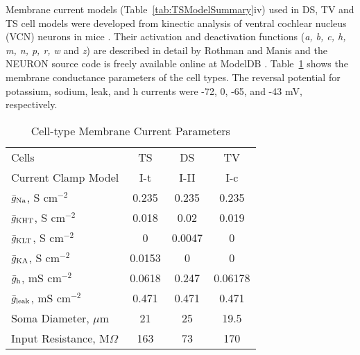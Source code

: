 Membrane current models (Table~\ref{tab:TSModelSummary}iv) used in
DS, TV and TS cell models were developed from kinectic analysis of
ventral cochlear nucleus (VCN) neurons in mice
\cite{RothmanManis:2003b}. Their activation and deactivation
functions (\textit{a, b, c, h, m, n, p, r, w} and \textit{z}) are
described in detail by Rothman and Manis \cite{RothmanManis:2003}
and the NEURON source code is freely available online at ModelDB
\cite{HinesMorseEtAl:2004}.  Table~\ref{tab:2} shows the membrane
conductance parameters of the cell types.  
The reversal potential for potassium, sodium, leak, and h currents were -72,
0, -65, and -43 mV, respectively.

\begin{table}[!th]
  \centering
  \caption{Cell-type Membrane Current Parameters}\label{tab:2}
  \begin{tabular}{lccc}
\hline
                Cells                 &   TS   &   DS   &   TV     \\ %
         Current Clamp Model          &  I-t   &  I-II  &   I-c    \\
\hline
 $\bar{g}_{{\rm Na}} $, S cm$^{-2}$   & 0.235  & 0.235  &  0.235      \\ %
 $\bar{g}_{{\rm KHT}} $, S cm$^{-2}$  & 0.018  &  0.02  &  0.019      \\ %
$\bar{g}_{{\rm  KLT}} $, S cm$^{-2}$  &   0    & 0.0047 &    0         \\ %
 $\bar{g}_{{\rm KA}} $, S cm$^{-2}$   & 0.0153 &   0    &    0        \\ %
 $\bar{g}_{{\rm h}} $, mS cm$^{-2}$   & 0.0618 & 0.247  & 0.06178     \\ %
$\bar{g}_{{\rm leak}} $, mS cm$^{-2}$ & 0.471  & 0.471  &  0.471      \\ %
        Soma Diameter, $\mu$m         &   21   &   25   &  19.5   \\ %
    Input Resistance, M$\Omega $      &  163   &   73   &   170   \\
\hline
\end{tabular}
\end{table}


